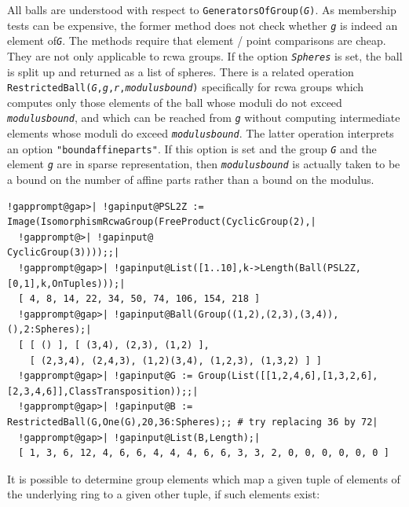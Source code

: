 \documentclass[a4paper,11pt]{report}
\begin{document}
{{{ All balls are understood with respect to \texttt{GeneratorsOfGroup(\mbox{\texttt{\mdseries\slshape G}})}. As membership tests can be expensive, the former method does not check
whether \mbox{\texttt{\mdseries\slshape g}} is indeed an element of{\nobreakspace}\mbox{\texttt{\mdseries\slshape G}}. The methods require that element\texttt{} / point comparisons are
cheap. They are not only applicable to rcwa groups. If the option \mbox{\texttt{\mdseries\slshape Spheres}} is set, the ball is split up and returned as a list of spheres. There is a
related operation \texttt{RestrictedBall(\mbox{\texttt{\mdseries\slshape G}},\mbox{\texttt{\mdseries\slshape g}},\mbox{\texttt{\mdseries\slshape r}},\mbox{\texttt{\mdseries\slshape modulusbound}})} specifically for rcwa groups which computes only those elements of the ball
whose moduli do not exceed \mbox{\texttt{\mdseries\slshape modulusbound}}, and which can be reached from \mbox{\texttt{\mdseries\slshape g}} without computing intermediate elements whose moduli do exceed \mbox{\texttt{\mdseries\slshape modulusbound}}. The latter operation interprets an option \texttt{"boundaffineparts"}. \texttt{}\texttt{} If this option is set and the group \mbox{\texttt{\mdseries\slshape G}} and the element \mbox{\texttt{\mdseries\slshape g}} are in sparse representation, then \mbox{\texttt{\mdseries\slshape modulusbound}} is actually taken to be a bound on the number of affine parts rather than a
bound on the modulus.  
\begin{Verbatim}[commandchars=!@|,fontsize=\small,frame=single,label=Example]
  !gapprompt@gap>| !gapinput@PSL2Z := Image(IsomorphismRcwaGroup(FreeProduct(CyclicGroup(2),|
  !gapprompt@>| !gapinput@                                                   CyclicGroup(3))));;|
  !gapprompt@gap>| !gapinput@List([1..10],k->Length(Ball(PSL2Z,[0,1],k,OnTuples)));|
  [ 4, 8, 14, 22, 34, 50, 74, 106, 154, 218 ]
  !gapprompt@gap>| !gapinput@Ball(Group((1,2),(2,3),(3,4)),(),2:Spheres);|
  [ [ () ], [ (3,4), (2,3), (1,2) ],
    [ (2,3,4), (2,4,3), (1,2)(3,4), (1,2,3), (1,3,2) ] ]
  !gapprompt@gap>| !gapinput@G := Group(List([[1,2,4,6],[1,3,2,6],[2,3,4,6]],ClassTransposition));;|
  !gapprompt@gap>| !gapinput@B := RestrictedBall(G,One(G),20,36:Spheres);; # try replacing 36 by 72|
  !gapprompt@gap>| !gapinput@List(B,Length);|
  [ 1, 3, 6, 12, 4, 6, 6, 4, 4, 4, 6, 6, 3, 3, 2, 0, 0, 0, 0, 0, 0 ]
\end{Verbatim}
 }

 It is possible to determine group elements which map a given tuple of elements
of the underlying ring to a given other tuple, if such elements exist: 

}}
\end{document}

